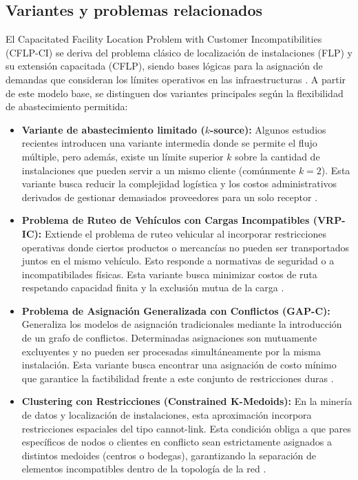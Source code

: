 \documentclass[letter, 10pt]{article}
\begin{document}
\subsection{Variantes y problemas relacionados}
El Capacitated Facility Location Problem with Customer Incompatibilities (CFLP-CI) se deriva del problema clásico de localización de instalaciones (FLP) y su extensión capacitada (CFLP), siendo bases lógicas para la asignación de demandas que consideran los límites operativos en las infraestructuras \cite{Gjergji2025, Maia2023}. A partir de este modelo base, se distinguen dos variantes principales según la flexibilidad de abastecimiento permitida:

\begin{itemize}
    \item \textbf{Variante de abastecimiento limitado ($k$-source):} Algunos estudios recientes introducen una variante intermedia donde se permite el flujo múltiple, pero además, existe un límite superior $k$ sobre la cantidad de instalaciones que pueden servir a un mismo cliente (comúnmente $k=2$). Esta variante busca reducir la complejidad logística y los costos administrativos derivados de gestionar demasiados proveedores para un solo receptor \cite{ceschia2024}.
    \item \textbf{Problema de Ruteo de Vehículos con Cargas Incompatibles (VRP-IC):} Extiende el problema de ruteo vehicular al incorporar restricciones operativas donde ciertos productos o mercancías no pueden ser transportados juntos en el mismo vehículo. Esto responde a normativas de seguridad o a incompatibilades físicas. Esta variante busca minimizar costos de ruta respetando capacidad finita y la exclusión mutua de la carga \cite{pollaris2015}.
    \item \textbf{Problema de Asignación Generalizada con Conflictos (GAP-C):} Generaliza los modelos de asignación tradicionales mediante la introducción de un grafo de conflictos. Determinadas asignaciones son mutuamente excluyentes y no pueden ser procesadas simultáneamente por la misma instalación. Esta variante busca encontrar una asignación de costo mínimo que garantice la factibilidad frente a este conjunto de restricciones duras \cite{dambrosio2020}.
    \item \textbf{Clustering con Restricciones (Constrained K-Medoids):} En la minería de datos y localización de instalaciones, esta aproximación incorpora restricciones espaciales del tipo cannot-link. Esta condición obliga a que pares específicos de nodos o clientes en conflicto sean estrictamente asignados a distintos medoides (centros o bodegas), garantizando la separación de elementos incompatibles dentro de la topología de la red \cite{wagstaff2001}.
\end{itemize}
\end{document}
